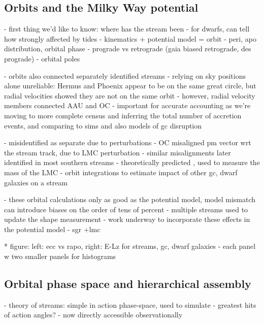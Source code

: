 \documentclass[final,5p,times,twocolumn,authoryear]{elsarticle}
\begin{document}
\subsection{Orbits and the Milky Way potential}
- first thing we'd like to know: where has the stream been
- for dwarfs, can tell how strongly affected by tides \citep{pace:2022}
- kinematics + potential model = orbit
- peri, apo distribution, orbital phase
- prograde vs retrograde (gaia biased retrograde, des prograde)
- orbital poles

- orbits also connected separately identified streams
- relying on sky positions alone unreliable: Hermus and Phoenix appear to be on the same great circle, but radial velocities showed they are not on the same orbit
- however, radial velocity members connected AAU \citep{li:2021} and OC \citep{koposov,aspen}
- important for accurate accounting as we're moving to more complete census and inferring the total number of accretion events, and comparing to sims \citep{pillepich:2015, shipp:2022, wright:2023, khoperskov:2023} and also models of gc disruption \citep{pearson}

- misidentified as separate due to perturbations
- OC misaligned pm vector wrt the stream track, due to LMC perturbation \citep{erkal}
- similar misalignments later identified in most southern streams \citep{shipp:2019}
- theoretically predicted \citep{garavito-camargo, lilleengen}, used to measure the mass of the LMC \citep{shipp, koposov}
- orbit integrations to estimate impact of other gc, dwarf galaxies on a stream \citep{bonaca:2019,}

- these orbital calculations only as good as the potential model, model mismatch can introduce biases on the order of tens of percent \citep[e.g.,][]{bonaca:2014, dsouza:2022, santistevan:2024}
- multiple streams used to update the shape measurement \citep{palau,}
- work underway to incorporate these effects in the potential model
- sgr +lmc \citep{tango, correa-magnus:2022}

* figure: left: ecc vs rapo, right: E-Lz for streams, gc, dwarf galaxies
- each panel w two smaller panels for histograms


\subsection{Orbital phase space and hierarchical assembly}
- theory of streams: simple in action phase-space, used to simulate
- greatest hits of action angles?
- now directly accessible observationally
\end{document}
